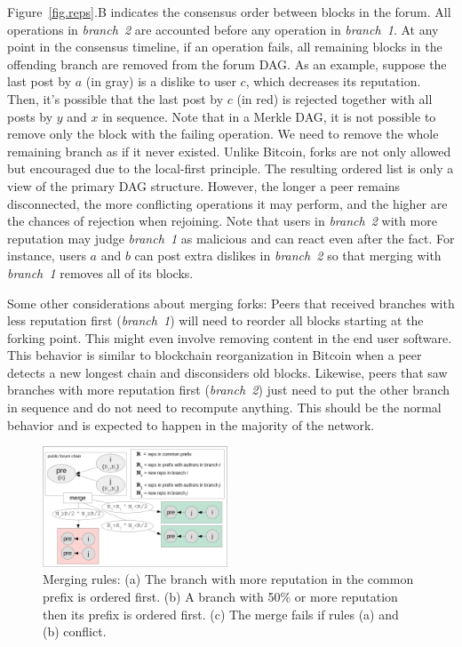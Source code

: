 \documentclass[10pt,journal,compsoc]{IEEEtran}
\begin{document}
Figure~\ref{fig.reps}.B indicates the consensus order between blocks in the
forum.
All operations in \emph{branch~2} are accounted before any operation in
\emph{branch~1}.
%
At any point in the consensus timeline, if an operation fails, all remaining
blocks in the offending branch are removed from the forum DAG.
As an example, suppose the last post by $a$ (in gray) is a dislike to user $c$,
which decreases its reputation.
Then, it's possible that the last post by $c$ (in red) is rejected together
with all posts by $y$ and $x$ in sequence.
Note that in a Merkle DAG, it is not possible to remove only the block with the
failing operation.
We need to remove the whole remaining branch as if it never existed.
%
Unlike Bitcoin, forks are not only allowed but encouraged due to the
local-first principle.
The resulting ordered list is only a view of the primary DAG structure.
However, the longer a peer remains disconnected, the more conflicting
operations it may perform, and the higher are the chances of rejection when
rejoining.
%
Note that users in \emph{branch~2} with more reputation may judge
\emph{branch~1} as malicious and can react even after the fact.
For instance, users $a$ and $b$ can post extra dislikes in \emph{branch~2} so
that merging with \emph{branch~1} removes all of its blocks.

Some other considerations about merging forks:
Peers that received branches with less reputation first (\emph{branch~1}) will
need to reorder all blocks starting at the forking point.
This might even involve removing content in the end user software.
This behavior is similar to blockchain reorganization in Bitcoin when a peer
detects a new longest chain and disconsiders old blocks.
%
Likewise, peers that saw branches with more reputation first (\emph{branch~2})
just need to put the other branch in sequence and do not need to recompute
anything.
This should be the normal behavior and is expected to happen in the majority of
the network.

\begin{figure}
\centering
\includegraphics[width=0.49\textwidth]{merge.png}
\caption{
    Merging rules:
    (a) The branch with more reputation in the common prefix is ordered first.
    (b) A branch with 50\% or more reputation then its prefix is ordered first.
    (c) The merge fails if rules (a) and (b) conflict.
}
\label{fig.merge}
\end{figure}
\end{document}
